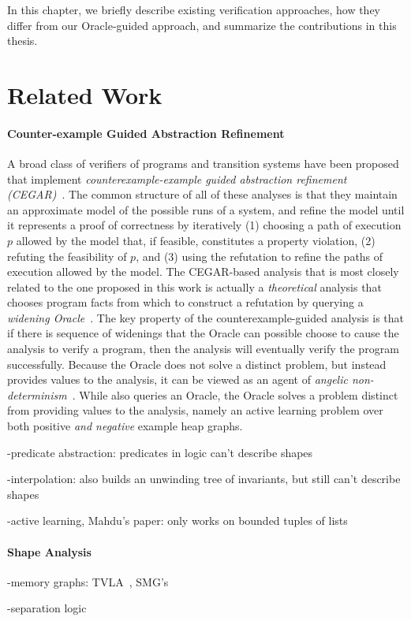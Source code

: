 \label{ch:conclusion}

In this chapter, we briefly describe existing verification approaches, how they differ from our Oracle-guided approach, and summarize the contributions in this thesis.
\section{Related Work}
\paragraph{Counter-example Guided Abstraction Refinement}
A broad class of verifiers of programs and transition systems have
been proposed that implement \emph{counterexample-example guided
  abstraction refinement (CEGAR)}~\cite{clarke03}.
%
The common structure of all of these analyses is that they maintain an
approximate model of the possible runs of a system, and refine the
model until it represents a proof of correctness by iteratively (1)
choosing a path of execution $p$ allowed by the model that, if
feasible, constitutes a property violation, (2) refuting the
feasibility of $p$, and (3) using the refutation to refine the paths
of execution allowed by the model.
The CEGAR-based analysis that is most closely related to the
one proposed in this work is actually a \emph{theoretical} analysis
that chooses program facts from which to construct a refutation by
querying a \emph{widening Oracle}~\cite{ball02}.
%
The key property of the counterexample-guided analysis is that if there is
sequence of widenings that the Oracle can possible choose to cause the
analysis to verify a program, then the analysis will eventually verify
the program successfully.
%
Because the Oracle does not solve a distinct problem, but instead
provides values to the analysis, it can be viewed as an agent of
\emph{angelic non-determinism}~\cite{bodik10}.
While \verifier also queries an Oracle, the Oracle solves a problem
distinct from providing values to the analysis, namely an active
learning problem over both positive \emph{and negative} example
heap graphs.

-predicate abstraction: predicates in logic can't describe shapes
\cite{ball01,henzinger02,henzinger04}

-interpolation: also builds an unwinding tree of invariants, but still
can't describe
shapes\cite{albarghouthi12,heizmann10,mcmillan06,rummer13}

-active learning, Mahdu's paper: only works on bounded tuples of
lists~\cite{garg13}

\paragraph{Shape Analysis}

-memory graphs: TVLA~\cite{sagiv02}, SMG's\cite{dudka13}

-separation logic~\cite{calcagano11,reynolds02}

